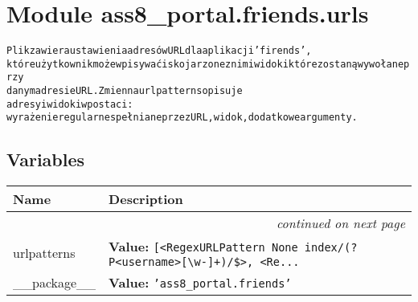 %
%
%


\section{Module ass8\_portal.friends.urls}

    \label{ass8_portal:friends:urls}
\begin{alltt}

Plik zawiera ustawienia adresów URL dla aplikacji 'firends', 
które użytkownik może wpisywać i skojarzone z nimi widoki które zostaną wywołane przy 
danym adresie URL. Zmienna urlpatterns opisuje 
adresy i widoki w postaci: 
    wyrażenie regularne spełniane przez URL, widok, dodatkowe argumenty.
\end{alltt}



  \subsection{Variables}

    \vspace{-1cm}
\hspace{\varindent}\begin{longtable}{|p{\varnamewidth}|p{\vardescrwidth}|l}
\cline{1-2}
\cline{1-2} \centering \textbf{Name} & \centering \textbf{Description}& \\
\cline{1-2}
\endhead\cline{1-2}\multicolumn{3}{r}{\small\textit{continued on next page}}\\\endfoot\cline{1-2}
\endlastfoot\raggedright u\-r\-l\-p\-a\-t\-t\-e\-r\-n\-s\- & \raggedright \textbf{Value:} 
{\tt \texttt{[}{\textless}RegexURLPattern None index/(?P{\textless}username{\textgreater}[{\textbackslash}w-]+)/\${\textgreater}\texttt{, }{\textless}Re\texttt{...}}&\\
\cline{1-2}
\raggedright \_\-\_\-p\-a\-c\-k\-a\-g\-e\-\_\-\_\- & \raggedright \textbf{Value:} 
{\tt \texttt{'}\texttt{ass8\_portal.friends}\texttt{'}}&\\
\cline{1-2}
\end{longtable}

